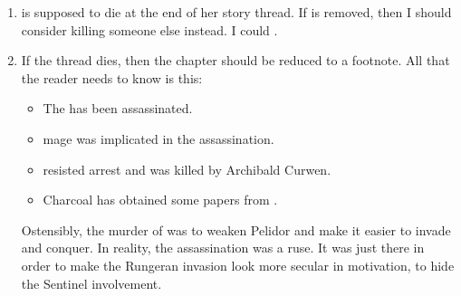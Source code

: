 \begin{enumerate}
  \item 
    \Tiroco is supposed to die at the end of her story thread. 
    If \Tiroco is removed, then I should consider killing someone else instead. 
    I could . 
    
  \item 
    If the \Tiroco thread dies, then the  chapter should be reduced to a footnote.
    All that the reader needs to know is this:
    \begin{itemize}
      \item The \rayuth has been assassinated.
      \item \Ishrah mage \Ambrose \Onatol was implicated in the assassination.
      \item \Onatol resisted arrest and was killed by Archibald Curwen.
      \item Charcoal has obtained some papers from \Onatol. 
    \end{itemize}
    
    Ostensibly, the murder of \Icor was to weaken Pelidor and make it easier to invade and conquer. 
    In reality, the assassination was a ruse.
    It was just there in order to make the Rungeran invasion look more secular in motivation, to hide the Sentinel involvement. 
\end{enumerate}

























